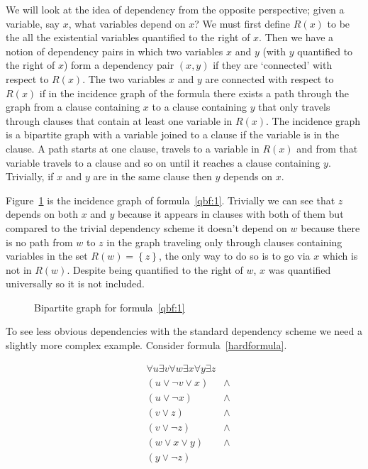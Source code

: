 We will look at the idea of dependency from the opposite perspective; given a variable, say $x$, what variables depend on $x$? We must first define $R(x)$ to be the all the existential variables quantified to the right of $x$. Then we have a notion of dependency pairs in which two variables $x$ and $y$ (with $y$ quantified to the right of $x$) form a dependency pair $(x,y)$ if they are `connected' with respect to $R(x)$. The two variables $x$ and $y$ are connected with respect to $R(x)$ if in the incidence graph of the formula there exists a path through the graph from a clause containing $x$ to a clause containing $y$ that only travels through clauses that contain at least one variable in $R(x)$. The incidence graph is a bipartite graph with a variable joined to a clause if the variable is in the clause. A path starts at one clause, travels to a variable in $R(x)$ and from that variable travels to a clause and so on until it reaches a clause containing $y$. Trivially, if $x$ and $y$ are in the same clause then $y$ depends on $x$.

Figure~\ref{bigrapheasy} is the incidence graph of formula~\ref{qbf:1}. Trivially we can see that $z$ depends on both $x$ and $y$ because it appears in clauses with both of them but compared to the trivial dependency scheme it doesn't depend on $w$ because there is no path from $w$ to $z$ in the graph traveling only through clauses containing variables in the set $R(w)=\left \{z\right \}$, the only way to do so is to go via $x$ which is not in $R(w)$. Despite being quantified to the right of $w$, $x$ was quantified universally so it is not included.

\begin{figure}
\begin{CenteredBox}

\end{CenteredBox}
\caption{Bipartite graph for formula~\ref{qbf:1}}
\label{bigrapheasy}
\end{figure}

To see less obvious dependencies with the standard dependency scheme we need a slightly more complex example. Consider formula~\ref{hardformula}.

\begin{equation}
\label{hardformula}
\begin{aligned}
&\forall u \exists v \forall w \exists x \forall y \exists z\\
&(u \lor \neg v \lor x) &\land\\
&(u \lor \neg x) &\land\\
&(v \lor z) &\land\\
&(v \lor \neg z) &\land\\
&(w \lor x \lor y) &\land\\
&(y \lor \neg z)\\
\end{aligned}
\end{equation}

